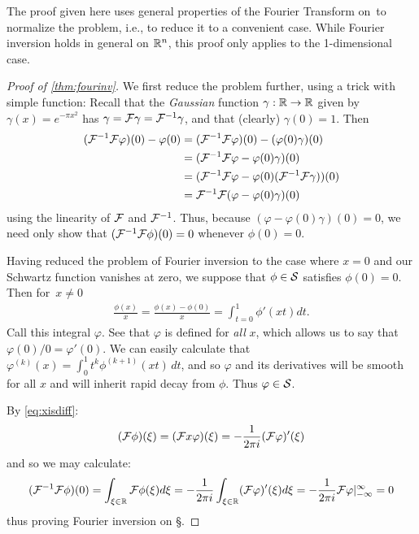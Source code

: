       \begin{rmk}
        The proof given here uses general properties of the Fourier Transform on~\R to normalize the problem, i.e., to reduce it to a convenient case.
        While Fourier inversion holds in general on $\R^n$, this proof only applies to the 1-dimensional case.
      \end{rmk}
      \begin{proof}[Proof of \cref{thm:fourinv}]
        We first reduce the problem further, using a trick with simple function:
        Recall that the \emph{Gaussian} function $\gamma:\R\rightarrow\R$ given by $\gamma(x) = e^{-\pi x^2}$ has $\gamma=\F\gamma=\F^{-1}\gamma$, and that (clearly) $\gamma(0)=1$.
        Then 
        \begin{align*}
          (\F^{-1}\F\varphi)(0) - \varphi(0) &= (\F^{-1}\F\varphi)(0) - (\varphi(0)\gamma)(0)\\
          &= (\F^{-1}\F\varphi - \varphi(0)\gamma)(0)\\
          &= (\F^{-1}\F\varphi - \varphi(0)(\F^{-1}\F\gamma))(0)\\
          &= \F^{-1}\F(\varphi-\varphi(0)\gamma)(0)
        \end{align*}
        using the linearity of $\F$ and $\F^{-1}$.
        Thus, because $(\varphi-\varphi(0)\gamma)(0)=0$, we need only show that $(\F^{-1}\F\phi)(0) = 0$ whenever $\phi(0)=0$.

        Having reduced the problem of Fourier inversion to the case where $x=0$ and our Schwartz function vanishes at zero, we suppose that $\phi\in\S$ satisfies $\phi(0)=0$. 
        Then for~$x\ne0$
        \begin{align*}
          \frac{\phi(x)}{x} = \frac{\phi(x)-\phi(0)}{x} = \int_{t=0}^1 \phi'(xt)dt \text{.}
        \end{align*}
        Call this integral $\varphi$.
        See that $\varphi$ is defined for \emph{all} $x$, which allows us to say that $\varphi(0)/0=\varphi'(0)$.
        We can easily calculate that $\varphi^{(k)}(x) = \int_0^1t^k\phi^{(k+1)}(xt)\,dt$, and so $\varphi$ and its derivatives will be smooth for all $x$ and will inherit rapid decay from $\phi$.
        Thus $\varphi\in\S$.

        By \cref{eq:xisdiff}:
        \begin{align*}
          (\F\phi)(\xi) = (\F x\varphi)(\xi)= -\frac{1}{2\pi i}(\F\varphi)'(\xi)
        \end{align*}
        and so we may calculate:
        \begin{align*}
          (\F^{-1}\F\phi)(0) = \int_{\xi\in\R} \F\phi(\xi)d\xi = -\frac{1}{2\pi i}\int_{\xi\in\R} (\F\varphi)'(\xi)d\xi = -\frac{1}{2\pi i} \F\varphi\vert_{-\infty}^\infty = 0
        \end{align*}
        thus proving Fourier inversion on \S.
      \end{proof}

